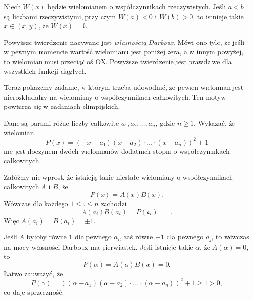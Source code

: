 \noindent
Niech $W(x)$ będzie wielomianem o współczynnikach rzeczywistych. Jeśli $a < b$ są liczbami rzeczywistymi, przy czym $W(a) < 0$ i $W(b) > 0$, to istnieje takie $x \in (x, y)$, że $W(x) = 0$.
\begin{center}
	
\end{center}

\vspace{20px}
\noindent
Powyższe twierdzenie nazywane jest \textit{własnością Darboux}. Mówi ono tyle, że jeśli w pewnym momencie wartość wielomianu jest poniżej zera, a w innym powyżej, to wielomian musi przeciąć oś OX. Powyższe twierdzenie jest prawdziwe dla wszystkich funkcji ciągłych.
\vspace{5px}


\noindent
Teraz pokażemy zadanie, w którym trzeba udowodnić, że pewien wielomian jest nierozkładalny na wielomiany o współczynnikach całkowitych. Ten motyw powtarza się w zadaniach olimpijskich.
\vspace{5px}


\noindent
Dane są parami różne liczby całkowite $a_1, a_2, ..., a_n$, gdzie $n \geqslant 1$. Wykazać, że wielomian 
\[
	P(x)=((x − a_1)(x − a_2)\cdot ...\cdot (x − a_n))^2 + 1
\]
nie jest iloczynem dwóch wielomianów dodatnich stopni o współczynnikach całkowitych.
\vspace{5px}


\noindent
Załóżmy nie wprost, że istnieją takie niestałe wielomiany o współczynnikach całkowitych $A$ i $B$, że
\[
	P(x) = A(x)B(x).
\]
Wówczas dla każdego $1 \leqslant i \leqslant n$ zachodzi
\[
	A(a_i)B(a_i) = P(a_i) = 1.
\]
Więc $A(a_i) = B(a_i) = \pm 1$. 

\vspace{10px}
\noindent
Jeśli $A$ byłoby równe $1$ dla pewnego $a_i$, zaś równe $-1$ dla pewnego $a_j$, to wówczas na mocy własności Darboux ma pierwiastek. Jeśli istnieje takie $\alpha$, że $A(\alpha) = 0$, to
\[
	P(\alpha) = A(\alpha)B(\alpha) = 0.
\]
Łatwo zauważyć, że
\[
	P(\alpha) = ((\alpha − a_1)(\alpha − a_2)\cdot ...\cdot (\alpha − a_n))^2 + 1 \geqslant 1 > 0,
\]
co daje sprzeczność.

